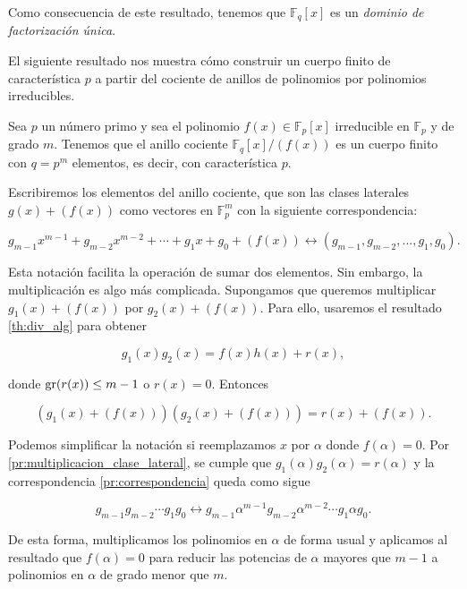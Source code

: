 Como consecuencia de este resultado, tenemos que $\mathbb{F}_q[x]$ es un \emph{dominio de factorización única}.

El siguiente resultado nos muestra cómo construir un cuerpo finito de característica $p$ a partir del cociente de anillos de polinomios por polinomios irreducibles.

\begin{proposition}
    Sea $p$ un número primo y sea el polinomio $f(x) \in \mathbb{F}_p[x]$ irreducible en $\mathbb{F}_p$ y de grado $m$. Tenemos que el anillo cociente $\mathbb{F}_q[x]/\left(f(x)\right)$ es un cuerpo finito con $q = p^m$ elementos, es decir, con característica $p$.
\end{proposition}

Escribiremos los elementos del anillo cociente, que son las clases laterales $g(x) + (f(x))$ como vectores en $\mathbb{F}_p^m$ con la siguiente correspondencia:

\begin{equation}
    \label{pr:correspondencia}
    g_{m-1} x^{m-1} + g_{m-2} x^{m-2} + \cdots + g_{1} x + g_0 + (f(x)) \leftrightarrow (g_{m-1}, g_{m-2}, ..., g_1, g_0).
\end{equation}

Esta notación facilita la operación de sumar dos elementos. Sin embargo, la multiplicación es algo más complicada. Supongamos que queremos multiplicar $g_1(x) + (f(x))$ por $g_2(x) + (f(x))$. Para ello, usaremos el resultado \ref{th:div_alg} para obtener

\begin{equation}
    \label{pr:multiplicacion_clase_lateral}
    g_1(x) g_2(x) = f(x) h(x) + r(x),
\end{equation}

donde $\operatorname{gr}(r(x)) \leq m - 1$ o $r(x) = 0$. Entonces 

$$(g_1(x) + (f(x))) (g_2(x) + (f(x))) = r(x) + (f(x)).$$

Podemos simplificar la notación si reemplazamos $x$ por $\alpha$ donde $f(\alpha) = 0$. Por \ref{pr:multiplicacion_clase_lateral}, se cumple que $g_1(\alpha) g_2(\alpha) = r(\alpha)$ y la correspondencia \ref{pr:correspondencia} queda como sigue

$$g_{m-1} g_{m-2} \cdots g_1 g_0 \leftrightarrow  g_{m-1} \alpha^{m-1} g_{m-2} \alpha^{m-2}\cdots g_1 \alpha g_0.$$

De esta forma, multiplicamos los polinomios en $\alpha$ de forma usual y aplicamos al resultado que $f(\alpha) = 0$ para reducir las potencias de $\alpha$ mayores que $m-1$ a polinomios en $\alpha$ de grado menor que $m$.


